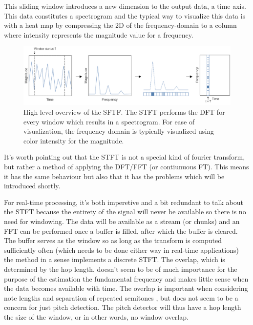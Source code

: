 This sliding window introduces a new dimension to the output data, a time axis. This data constitutes a spectrogram and the typical way to visualize this data is with a heat map by compressing the 2D of the frequency-domain to a column where intensity represents the magnitude value for a frequency. 

\begin{figure}[ht]
    \centering
    \includegraphics[width=\textwidth]{./images/stft.png}
    \caption{High level overview of the SFTF. The STFT performs the DFT for every window which results in a spectrogram. For ease of visualization, the frequency-domain is typically visualized using color intensity for the magnitude. \label{fig:stft}}
\end{figure}

It's worth pointing out that the STFT is not a special kind of fourier transform, but rather a method of applying the DFT/FFT (or contiunuous FT). This means it has the same behaviour but also that it has the problems which will be introduced shortly. 

For real-time processing, it's both imperetive and a bit redundant to talk about the STFT because the entirety of the signal will never be available so there is no need for windowing. The data will be available as a stream (or chunks) and an FFT can be performed once a buffer is filled, after which the buffer is cleared. The buffer serves as the window so as long as the transform is computed sufficiently often (which needs to be done either way in real-time applications) the method in a sense implements a discrete STFT. The overlap, which is determined by the hop length, doesn't seem to be of much importance for the purpose of the estimation the fundamental frequency and makes little sense when the data becomes available with time. The overlap is important when considering note lengths and separation of repeated semitones \cite{Evans2012}, but does not seem to be a concern for just pitch detection. The pitch detector will thus have a hop length the size of the window, or in other words, no window overlap.

